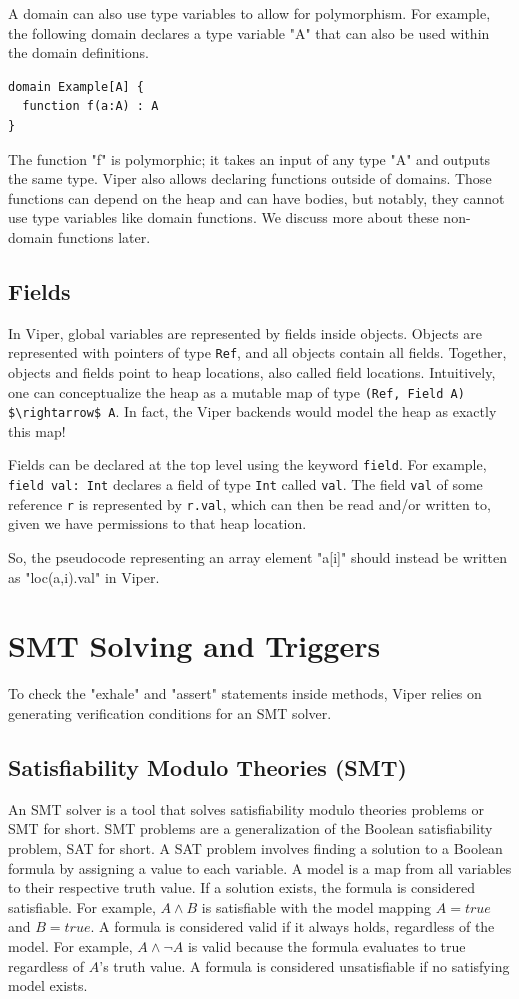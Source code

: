 \documentclass[msc,oneside]{ubcthesis}
\theoremstyle{definition}
\begin{document}
A domain can also use type variables to allow for polymorphism. For example, the following domain declares a type variable "A" that can also be used within the domain definitions.
\begin{lstlisting}
domain Example[A] {
  function f(a:A) : A
}
\end{lstlisting}
The function "f" is polymorphic; it takes an input of any type "A" and outputs the same type. Viper also allows declaring functions outside of domains. Those functions can depend on the heap and can have bodies, but notably, they cannot use type variables like domain functions. We discuss more about these non-domain functions later.

\subsection{Fields}
In Viper, global variables are represented by fields inside objects. Objects are represented with pointers of type \lstinline{Ref}, and all objects contain all fields. Together, objects and fields point to heap locations, also called field locations. Intuitively, one can conceptualize the heap as a mutable map of type \lstinline{(Ref, Field A) $\rightarrow$ A}. In fact, the Viper backends would model the heap as exactly this map!

Fields can be declared at the top level using the keyword \lstinline|field|. For example, \lstinline|field val: Int| declares a field of type \lstinline{Int} called \lstinline{val}. The field \lstinline|val| of some reference \lstinline|r| is represented by \lstinline|r.val|, which can then be read and/or written to, given we have permissions to that heap location.

So, the pseudocode representing an array element "a[i]" should instead be written as "loc(a,i).val" in Viper.

\section{SMT Solving and Triggers}
To check the "exhale" and "assert" statements inside methods, Viper relies on generating verification conditions for an SMT solver.

\subsection{Satisfiability Modulo Theories (SMT)}
An SMT solver is a tool that solves satisfiability modulo theories problems or SMT for short. SMT problems are a generalization of the Boolean satisfiability problem, SAT for short. A SAT problem involves finding a solution to a Boolean formula by assigning a value to each variable. A model is a map from all variables to their respective truth value. If a solution exists, the formula is considered satisfiable. For example, $A \land B$ is satisfiable with the model mapping $A = \textit{true}$ and $B = \textit{true}$. A formula is considered valid if it always holds, regardless of the model. For example, $A \land \neg A$ is valid because the formula evaluates to true regardless of $A$'s truth value. A formula is considered unsatisfiable if no satisfying model exists. 
\end{document}
